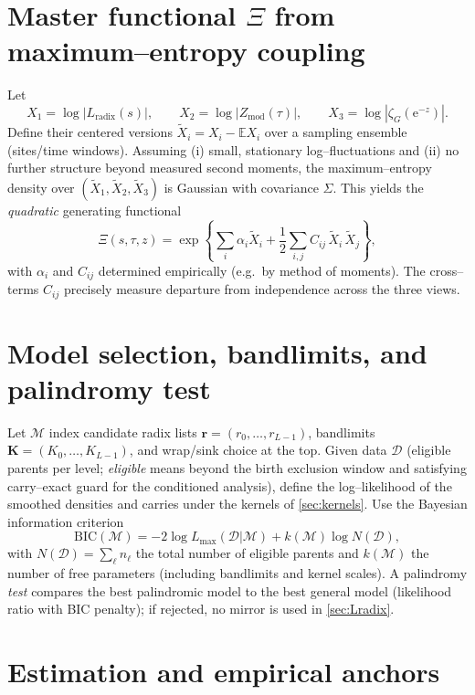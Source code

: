 \documentclass[11pt]{article}
\newcommand{\e}{\mathrm{e}}
\newcommand{\E}{\mathbb{E}}
\begin{document}
\section{Master functional $\Xi$ from maximum--entropy coupling}
Let
\begin{equation}
X_1=\log|L_{\mathrm{radix}}(s)|,\qquad X_2=\log|Z_{\mathrm{mod}}(\tau)|,\qquad X_3=\log|\zeta_G(\e^{-z})|.
\end{equation}
Define their centered versions $\tilde X_i=X_i-\E X_i$ over a sampling ensemble (sites/time windows).
Assuming (i) small, stationary log--fluctuations and (ii) no further structure beyond measured second moments, the maximum--entropy density over $(\tilde X_1,\tilde X_2,\tilde X_3)$ is Gaussian with covariance $\Sigma$.
This yields the \emph{quadratic} generating functional
\begin{equation}
\Xi(s,\tau,z)=\exp\!\left\{\sum_{i}\alpha_i \tilde X_i+\frac{1}{2}\sum_{i,j} C_{ij}\,\tilde X_i\,\tilde X_j\right\},
\label{eq:Xi}
\end{equation}
with $\alpha_i$ and $C_{ij}$ determined empirically (e.g.\ by method of moments). The cross--terms $C_{ij}$ precisely measure departure from independence across the three views.

\section{Model selection, bandlimits, and palindromy test}
\label{sec:BIC}
Let $\mathcal{M}$ index candidate radix lists $\bm r=(r_0,\dots,r_{L-1})$, bandlimits $\bm K=(K_0,\dots,K_{L-1})$, and wrap/sink choice at the top.
Given data $\mathcal{D}$ (eligible parents per level; \emph{eligible} means beyond the birth exclusion window and satisfying carry--exact guard for the conditioned analysis), define the log--likelihood of the smoothed densities and carries under the kernels of \cref{sec:kernels}.
Use the Bayesian information criterion
\begin{equation}
\mathrm{BIC}(\mathcal{M})=-2\log L_{\max}(\mathcal{D}|\mathcal{M})+k(\mathcal{M})\log N(\mathcal{D}),
\end{equation}
with $N(\mathcal{D})=\sum_\ell n_\ell$ the total number of eligible parents and $k(\mathcal{M})$ the number of free parameters (including bandlimits and kernel scales).
A palindromy \emph{test} compares the best palindromic model to the best general model (likelihood ratio with BIC penalty); if rejected, no mirror is used in \cref{sec:Lradix}.

\section{Estimation and empirical anchors}
\end{document}
